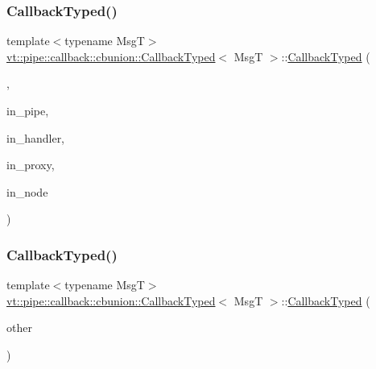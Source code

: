 \subsubsection{\texorpdfstring{Callback\+Typed()}{CallbackTyped()}\hspace{0.1cm}{\footnotesize\ttfamily [12/14]}}
{\footnotesize\ttfamily template$<$typename MsgT$>$ \\
\hyperlink{structvt_1_1pipe_1_1callback_1_1cbunion_1_1_callback_typed}{vt\+::pipe\+::callback\+::cbunion\+::\+Callback\+Typed}$<$ MsgT $>$\+::\hyperlink{structvt_1_1pipe_1_1callback_1_1cbunion_1_1_callback_typed}{Callback\+Typed} (\begin{DoxyParamCaption}\item[{Raw\+Send\+Obj\+Grp\+Tag\+Type}]{,  }\item[{\hyperlink{namespacevt_ac9852acda74d1896f48f406cd72c7bd3}{Pipe\+Type}}]{in\+\_\+pipe,  }\item[{\hyperlink{namespacevt_af64846b57dfcaf104da3ef6967917573}{Handler\+Type}}]{in\+\_\+handler,  }\item[{\hyperlink{namespacevt_ad7cae989df485fccca57f0792a880a8e}{Obj\+Group\+Proxy\+Type}}]{in\+\_\+proxy,  }\item[{\hyperlink{namespacevt_a866da9d0efc19c0a1ce79e9e492f47e2}{Node\+Type}}]{in\+\_\+node }\end{DoxyParamCaption})\hspace{0.3cm}{\ttfamily [inline]}}

\mbox{\label{structvt_1_1pipe_1_1callback_1_1cbunion_1_1_callback_typed_a3cb4289b3d7353d03fcdfb6d7c52bb7a}} 
\subsubsection{\texorpdfstring{Callback\+Typed()}{CallbackTyped()}\hspace{0.1cm}{\footnotesize\ttfamily [13/14]}}
{\footnotesize\ttfamily template$<$typename MsgT$>$ \\
\hyperlink{structvt_1_1pipe_1_1callback_1_1cbunion_1_1_callback_typed}{vt\+::pipe\+::callback\+::cbunion\+::\+Callback\+Typed}$<$ MsgT $>$\+::\hyperlink{structvt_1_1pipe_1_1callback_1_1cbunion_1_1_callback_typed}{Callback\+Typed} (\begin{DoxyParamCaption}\item[{\hyperlink{structvt_1_1pipe_1_1callback_1_1cbunion_1_1_callback_raw_base_single}{Callback\+Raw\+Base\+Single} const \&}]{other }\end{DoxyParamCaption})\hspace{0.3cm}{\ttfamily [inline]}}

